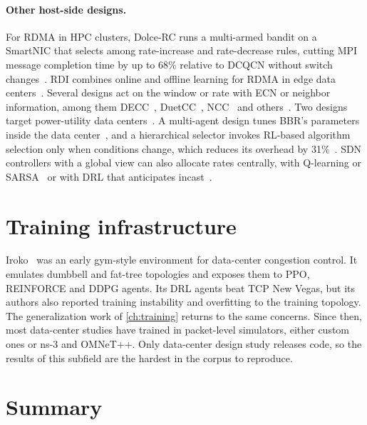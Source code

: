 \paragraph{Other host-side designs.} For RDMA in HPC clusters, Dolce-RC runs a multi-armed bandit on a SmartNIC that selects among rate-increase and rate-decrease rules, cutting MPI message completion time by up to 68\% relative to DCQCN without switch changes~\cite{ye2023data}. RDI combines online and offline learning for RDMA in edge data centers~\cite{wang2025rdma}. Several designs act on the window or rate with ECN or neighbor information, among them DECC~\cite{liu2023decc}, DuetCC~\cite{chengfeng2025duetcc}, NCC~\cite{wang2022ncc} and others~\cite{xiao2022optimal,hassan2021tcp}. Two designs target power-utility data centers~\cite{huang2023acc,chen2025research}. A multi-agent design tunes BBR's parameters inside the data center~\cite{ketabi2023deep}, and a hierarchical selector invokes RL-based algorithm selection only when conditions change, which reduces its overhead by 31\%~\cite{hu2025hierarchical}. SDN controllers with a global view can also allocate rates centrally, with Q-learning or SARSA~\cite{jin2018congestion} or with DRL that anticipates incast~\cite{guo2022congestion}.

\section{Training infrastructure}
\label{sec:dc-infra}

Iroko~\cite{ruffy2018iroko} was an early gym-style environment for data-center congestion control. It emulates dumbbell and fat-tree topologies and exposes them to PPO, REINFORCE and DDPG agents. Its DRL agents beat TCP New Vegas, but its authors also reported training instability and overfitting to the training topology. The generalization work of \cref{ch:training} returns to the same concerns. Since then, most data-center studies have trained in packet-level simulators, either custom ones or ns-3 and OMNeT++. Only \nChDatacenterCode{} data-center design study releases code, so the results of this subfield are the hardest in the corpus to reproduce.

\section{Summary}
\label{sec:dc-summary}

